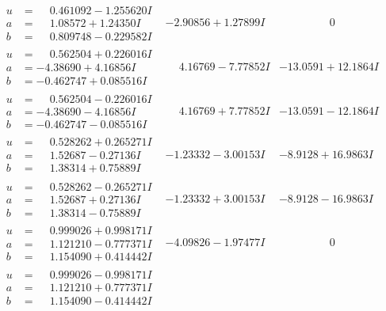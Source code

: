 \documentclass[1p]{elsarticle_modified}
\theoremstyle{definition}
\begin{document}
$$\begin{array}{c|c|c}
\begin{aligned}
u &= \phantom{-}0.461092 - 1.255620 I \\
a &= \phantom{-}1.08572 + 1.24350 I \\
b &= \phantom{-}0.809748 - 0.229582 I\end{aligned}
 & -2.90856 + 1.27899 I & \phantom{-0.000000 } 0 \\ \hline\begin{aligned}
u &= \phantom{-}0.562504 + 0.226016 I \\
a &= -4.38690 + 4.16856 I \\
b &= -0.462747 + 0.085516 I\end{aligned}
 & \phantom{-}4.16769 - 7.77852 I & -13.0591 + 12.1864 I \\ \hline\begin{aligned}
u &= \phantom{-}0.562504 - 0.226016 I \\
a &= -4.38690 - 4.16856 I \\
b &= -0.462747 - 0.085516 I\end{aligned}
 & \phantom{-}4.16769 + 7.77852 I & -13.0591 - 12.1864 I \\ \hline\begin{aligned}
u &= \phantom{-}0.528262 + 0.265271 I \\
a &= \phantom{-}1.52687 - 0.27136 I \\
b &= \phantom{-}1.38314 + 0.75889 I\end{aligned}
 & -1.23332 - 3.00153 I & -8.9128 + 16.9863 I \\ \hline\begin{aligned}
u &= \phantom{-}0.528262 - 0.265271 I \\
a &= \phantom{-}1.52687 + 0.27136 I \\
b &= \phantom{-}1.38314 - 0.75889 I\end{aligned}
 & -1.23332 + 3.00153 I & -8.9128 - 16.9863 I \\ \hline\begin{aligned}
u &= \phantom{-}0.999026 + 0.998171 I \\
a &= \phantom{-}1.121210 - 0.777371 I \\
b &= \phantom{-}1.154090 + 0.414442 I\end{aligned}
 & -4.09826 - 1.97477 I & \phantom{-0.000000 } 0 \\ \hline\begin{aligned}
u &= \phantom{-}0.999026 - 0.998171 I \\
a &= \phantom{-}1.121210 + 0.777371 I \\
b &= \phantom{-}1.154090 - 0.414442 I\end{aligned}

\end{array}$$
\end{document}
